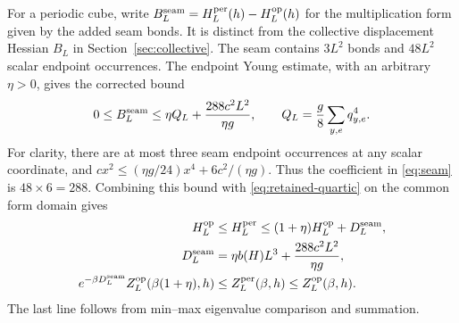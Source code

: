 \documentclass[11pt]{article}
\numberwithin{equation}{section}
\theoremstyle{definition}
\begin{document}
For a periodic cube, write $B_L^{\rm seam}=H_L^{\rm per}(h)-H_L^{\rm op}(h)$
for the multiplication form given by the added seam bonds.  It is distinct
from the collective displacement Hessian $B_L$ in Section~\ref{sec:collective}.
The seam contains $3L^2$ bonds and $48L^2$ scalar
endpoint occurrences.  The endpoint Young estimate, with an arbitrary
$\eta>0$, gives the corrected bound
\begin{equation}
 0\leq B_L^{\rm seam}\leq \eta Q_L+\frac{288c^2L^2}{\eta g},\qquad
 Q_L=\frac g8\sum_{y,e}q_{y,e}^4. \label{eq:seam}
\end{equation}
For clarity, there are at most three seam endpoint occurrences at any
scalar coordinate, and
$cx^2\leq(\eta g/24)x^4+6c^2/(\eta g)$.
Thus the coefficient in \eqref{eq:seam} is $48\times6=288$.
Combining this bound with \eqref{eq:retained-quartic} on the common form
domain gives
\begin{align}
 H_L^{\rm op}&\leq H_L^{\rm per}
       \leq(1+\eta)H_L^{\rm op}+D_L^{\rm seam},\nonumber\\
 D_L^{\rm seam}&=\eta b(H)L^3+\frac{288c^2L^2}{\eta g},\nonumber\\
 e^{-\beta D_L^{\rm seam}}Z_L^{\rm op}(\beta(1+\eta),h)
 &\leq Z_L^{\rm per}(\beta,h)\leq Z_L^{\rm op}(\beta,h).
 \label{eq:seam-trace-sandwich}
\end{align}
The last line follows from min--max eigenvalue comparison and summation.
\end{document}
